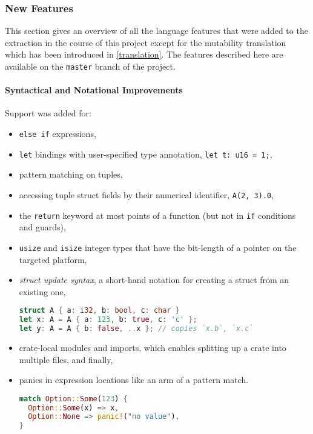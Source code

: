 \subsubsection{New Features}

This section gives an overview of all the language features that were added to
the extraction in the course of this project except for the mutability
translation which has been introduced in \autoref{translation}. The features
described here are available on the \lstinline!master! branch of the project.

\paragraph{Syntactical and Notational Improvements}

Support was added for:

\begin{itemize}
\item
  \passthrough{\lstinline!else if!} expressions,
\item
  \passthrough{\lstinline!let!} bindings with user-specified type
  annotation, \passthrough{\lstinline!let t: u16 = 1;!},
\item
  pattern matching on tuples,
\item
  accessing tuple struct fields by their numerical identifier,
  \passthrough{\lstinline!A(2, 3).0!},
\item
  the \passthrough{\lstinline!return!} keyword at most points
  of a function (but not in \lstinline!if! conditions and guards),
\item
  \passthrough{\lstinline!usize!} and \passthrough{\lstinline!isize!}
  integer types that have the bit-length of a pointer on the targeted
  platform,
\item
  \emph{struct update syntax}, a short-hand notation for creating a
  struct from an existing one,
\begin{lstlisting}[language=Rust, style=short]
struct A { a: i32, b: bool, c: char }
let x: A = A { a: 123, b: true, c: 'c' };
let y: A = A { b: false, ..x }; // copies `x.b`, `x.c`
\end{lstlisting}

\item crate-local modules and imports, which enables splitting up a crate into
multiple files, and finally,

\item
  panics in expression locations like an arm of a pattern match.
\begin{lstlisting}[language=Rust, style=short]
match Option::Some(123) {
  Option::Some(x) => x,
  Option::None => panic!("no value"),
}
\end{lstlisting}

\end{itemize}

